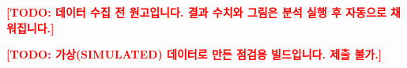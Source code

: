 \documentclass[11pt,a4paper]{article}
\title{\PaperTitle}
\author{\PaperAuthor}
\date{\PaperDate}
\newcommand{\TODO}[1]{\textcolor{red}{\textbf{[TODO: #1]}}}
\begin{document}
\maketitle

\ifnum{}
  \begin{center}\colorbox{red!10}{\parbox{0.9\linewidth}{\centering\color{red!70!black}
  \TODO{데이터 수집 전 원고입니다. 결과 수치와 그림은 분석 실행 후 자동으로 채워집니다.}}}\end{center}
\fi
\ifnum{}
  \begin{center}\colorbox{red!10}{\parbox{0.9\linewidth}{\centering\color{red!70!black}\bfseries
  \TODO{가상(SIMULATED) 데이터로 만든 점검용 빌드입니다. 제출 불가.}}}\end{center}
\fi










\appendix

\end{document}
